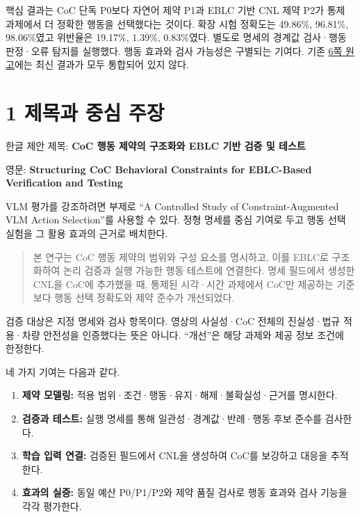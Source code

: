 \documentclass[11pt,a4paper]{article}
\begin{document}
핵심 결과는 CoC 단독 P0보다 자연어 제약 P1과 EBLC 기반 CNL 제약 P2가 통제 과제에서 더 정확한 행동을 선택했다는 것이다. 확장 시험 정확도는 49.86\%, 96.81\%, 98.06\%였고 위반율은 19.17\%, 1.39\%, 0.83\%였다. 별도로 명세의 경계값 검사·행동 판정·오류 탐지를 실행했다. 행동 효과와 검사 가능성은 구별되는 기여다. 기존 \href{\detokenize{../../../../../../projects/04-guardsynth-coc/paper/ieee-access/main.tex}}{6쪽 원고}에는 최신 결과가 모두 통합되어 있지 않다.\par

\clearpage{}\section*{1 제목과 중심 주장}

한글 제안 제목: \textbf{CoC 행동 제약의 구조화와 EBLC 기반 검증 및 테스트}\par

영문: \textbf{Structuring CoC Behavioral Constraints for EBLC-Based Verification and Testing}\par

VLM 평가를 강조하려면 부제로 “A Controlled Study of Constraint-Augmented VLM Action Selection”를 사용할 수 있다. 정형 명세를 중심 기여로 두고 행동 선택 실험을 그 활용 효과의 근거로 배치한다.\par

\begin{quote}본 연구는 CoC 행동 제약의 범위와 구성 요소를 명시하고, 이를 EBLC로 구조화하여 논리 검증과 실행 가능한 행동 테스트에 연결한다. 명세 필드에서 생성한 CNL을 CoC에 추가했을 때, 통제된 시각·시간 과제에서 CoC만 제공하는 기준보다 행동 선택 정확도와 제약 준수가 개선되었다.\end{quote}

검증 대상은 지정 명세와 검사 항목이다. 영상의 사실성·CoC 전체의 진실성·법규 적용·차량 안전성을 인증했다는 뜻은 아니다. “개선”은 해당 과제와 제공 정보 조건에 한정한다.\par

네 가지 기여는 다음과 같다.\par

\begin{enumerate}
\item \textbf{제약 모델링:} 적용 범위·조건·행동·유지·해제·불확실성·근거를 명시한다.
\item \textbf{검증과 테스트:} 실행 명세를 통해 일관성·경계값·반례·행동 후보 준수를 검사한다.
\item \textbf{학습 입력 연결:} 검증된 필드에서 CNL을 생성하여 CoC를 보강하고 대응을 추적한다.
\item \textbf{효과의 실증:} 동일 예산 P0/P1/P2와 제약 품질 검사로 행동 효과와 검사 기능을 각각 평가한다.
\end{enumerate}
\end{document}
